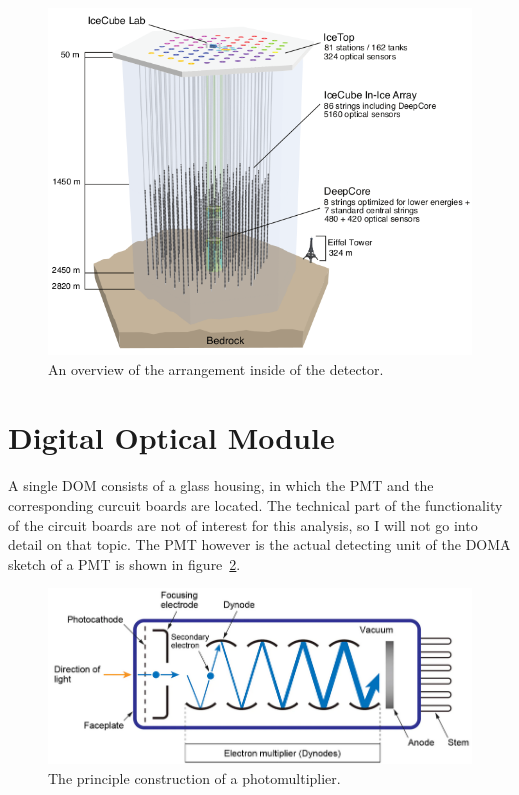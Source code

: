 \begin{figure}[htbp]
    \centering
    \includegraphics[width=\textwidth]{content/pictures/icecube_sketch_01.png}
    \caption{An overview of the arrangement inside of the detector.}\label{fig:icecube_sketch_01}
\end{figure}

\section{Digital Optical Module}

A single DOM consists of a glass housing, in which the PMT and the corresponding curcuit boards are located. The technical part of the functionality of 
the circuit boards are not of interest for this analysis, so I will not go into detail on that topic. The PMT however is the actual detecting unit of 
the DOM\. A sketch of a PMT is shown in figure~\ref{fig:pmt01}.

\begin{figure}[htbp]
    \centering
    \includegraphics[width=\textwidth]{content/pictures/pmt_sketch_01.png}
    \caption{The principle construction of a photomultiplier.}\label{fig:pmt01}
\end{figure}

